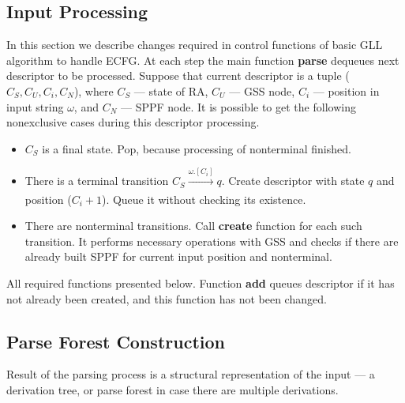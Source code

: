 \documentclass[runningheads,a4paper]{llncs}
\begin{document}
\subsection{Input Processing}%

In this section we describe changes required in control functions of basic GLL algorithm to handle ECFG.
At each step the main function \textbf{parse} dequeues next descriptor to be processed.
Suppose that current descriptor is a tuple ($C_S, C_U, C_i, C_N$), where $C_S$ --- state of RA, $C_U$ --- GSS node, $C_i$ --- position in input string $\omega$, and $C_N$ --- SPPF node. 
It is possible to get the following nonexclusive cases during this descriptor processing.

\begin{itemize} 
\item $C_S$ is a final state. Pop, because processing of nonterminal finished.
\item There is a terminal transition $C_S \xrightarrow[]{\omega.[C_i]} q$. 
Create descriptor with state $ q $ and position ($ C_i + 1 $).
Queue it without checking its existence.
\item There are nonterminal transitions. Call \textbf{create} function for
each such transition.
It performs necessary operations with GSS and checks if there are already built SPPF for current
input position and nonterminal.
\end{itemize}

All required functions presented below.
Function \textbf{add} queues descriptor if it has not already been created, and this function has not been changed.










\subsection{Parse Forest Construction}

Result of the parsing process is a structural representation of the input --- a derivation tree, or parse forest in case there are multiple derivations.
\end{document}
